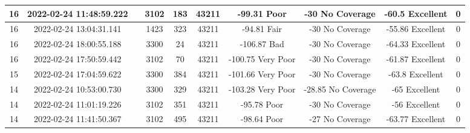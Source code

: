 \begin{longtable*}{|c|c|c|c|c|c|c|c|c|c|}
16&2022-02-24 11:48:59.222&&3102&183&43211& -99.31    Poor        & -30       No Coverage & -60.5     Excellent   & 0\\\hline
{}16&2022-02-24 13:04:31.141&&1423&323&43211& -94.81    Fair        & -30       No Coverage & -55.86    Excellent   & 0\\\hline
{}16&2022-02-24 18:00:55.188&&3300&24&43211& -106.87   Bad         & -30       No Coverage & -64.33    Excellent   & 0\\\hline
{}16&2022-02-24 17:50:59.442&&3102&70&43211& -100.75   Very Poor   & -30       No Coverage & -61.87    Excellent   & 0\\\hline
{}15&2022-02-24 17:04:59.622&&3300&384&43211& -101.66   Very Poor   & -30       No Coverage & -63.8     Excellent   & 0\\\hline
{}14&2022-02-24 10:53:00.730&&3300&329&43211& -103.28   Very Poor   & -28.85    No Coverage & -65       Excellent   & 0\\\hline
{}14&2022-02-24 11:01:19.226&&3102&351&43211& -95.78    Poor        & -30       No Coverage & -56       Excellent   & 0\\\hline
{}14&2022-02-24 11:41:50.367&&3102&495&43211& -98.64    Poor        & -27       No Coverage & -63.77    Excellent   & 0\\\hline

\end{longtable*}
